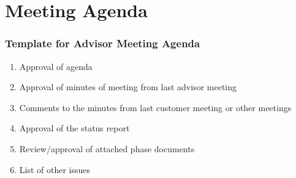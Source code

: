 \section{Meeting Agenda}
\subsubsection{Template for Advisor Meeting Agenda}
\begin{enumerate}
	\item Approval of agenda
	\item Approval of minutes of meeting from last advisor meeting
	\item Comments to the minutes from last customer meeting or other meetings
	\item Approval of the status report
	\item Review/approval of attached phase documents
	\item List of other issues
\end{enumerate}